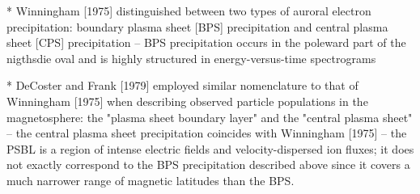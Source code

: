 
* Winningham [1975] distinguished between two types of auroral electron
precipitation: boundary plasma sheet [BPS] precipitation and central
plasma sheet [CPS] precipitation
 -- BPS precipitation occurs in the poleward part of the nigthsdie oval
 and is highly structured in energy-versus-time spectrograms

* DeCoster and Frank [1979] employed similar nomenclature to that of
Winningham [1975] when describing observed particle populations in 
the magnetosphere: the "plasma sheet boundary layer" and
the "central plasma sheet"
 -- the central plasma sheet precipitation coincides with Winningham
 [1975]
 -- the PSBL is a region of intense electric fields and
 velocity-dispersed ion fluxes; it does not exactly correspond to the BPS 
 precipitation described above since it covers a much narrower range of 
 magnetic latitudes than the BPS.
